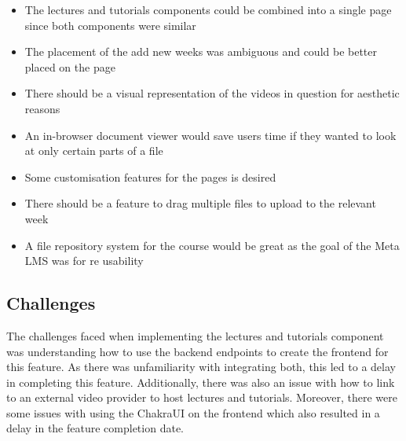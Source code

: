 \begin{itemize}
    \item The lectures and tutorials components could be combined into a single page since both components were similar
    \item The placement of the add new weeks was ambiguous and could be better placed on the page
    \item There should be a visual representation of the videos in question for aesthetic reasons
    \item An in-browser document viewer would save users time if they wanted to look at only certain parts of a file
    \item Some customisation features for the pages is desired
    \item There should be a feature to drag multiple files to upload to the relevant week
    \item A file repository system for the course would be great as the goal of the Meta LMS was for re usability
\end{itemize}

\subsection{Challenges}
The challenges faced when implementing the lectures and tutorials component was understanding how to use the backend endpoints to create the frontend for this feature. As there was unfamiliarity with integrating both, this led to a delay in completing this feature. Additionally, there was also an issue with how to link to an external video provider to host lectures and tutorials. Moreover, there were some issues with using the ChakraUI on the frontend which also resulted in a delay in the feature completion date.